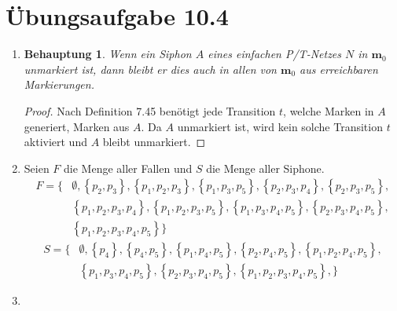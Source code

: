 \documentclass[a4paper]{scrartcl}
\newtheorem*{behaupt}{Behauptung}
\begin{document}
\section*{Übungsaufgabe 10.4} 
\begin{enumerate}
    \item
        \begin{behaupt}
            Wenn ein Siphon $A$ eines einfachen P/T-Netzes $N$ in $\textbf{m}_0$
            unmarkiert ist, dann bleibt er dies auch in allen von $\textbf{m}_0$
            aus erreichbaren Markierungen.
        \end{behaupt}
        \begin{proof}
            Nach Definition 7.45 benötigt jede Transition $t$, welche Marken in
            $A$ generiert, Marken aus $A$.
            Da $A$ unmarkiert ist, wird kein solche Transition $t$ aktiviert und
            $A$ bleibt unmarkiert.
        \end{proof}

    \item
        Seien $F$ die Menge aller Fallen und $S$ die Menge aller Siphone.
        \begin{equation}
            \begin{split}
                F = \Big\{
                    & \emptyset,
                    \left\{ p_2, p_3 \right\},
                    \left\{ p_1, p_2, p_3 \right\},
                    \left\{ p_1, p_3, p_5 \right\},
                    \left\{ p_2, p_3, p_4 \right\},
                    \left\{ p_2, p_3, p_5 \right\}, \\
                    & \left\{ p_1, p_2, p_3, p_4 \right\},
                    \left\{ p_1, p_2, p_3, p_5 \right\},
                    \left\{ p_1, p_3, p_4, p_5 \right\},
                    \left\{ p_2, p_3, p_4, p_5 \right\}, \\
                    & \left\{ p_1, p_2, p_3, p_4, p_5 \right\}
                \Big\}
            \end{split}
        \end{equation}
        \begin{equation}
            \begin{split}
                S = \Big\{
                    & \emptyset,
                    \left\{ p_4 \right\},
                    \left\{ p_4, p_5 \right\},
                    \left\{ p_1, p_4, p_5 \right\},
                    \left\{ p_2, p_4, p_5 \right\},
                    \left\{ p_1, p_2, p_4, p_5 \right\}, \\
                    & \left\{ p_1, p_3, p_4, p_5 \right\},
                    \left\{ p_2, p_3, p_4, p_5 \right\},
                    \left\{ p_1, p_2, p_3, p_4, p_5 \right\},
                \Big\}
            \end{split}
        \end{equation}

    \item

\end{enumerate}
\end{document}
